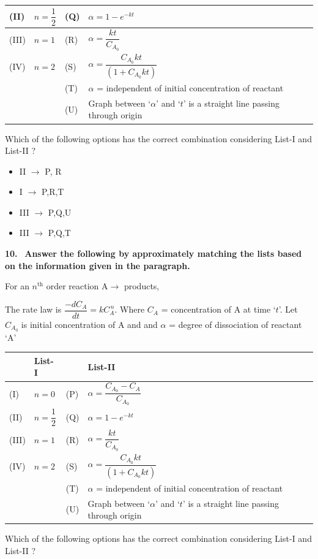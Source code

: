 \documentclass[10pt]{extarticle}
\newcommand{\qn}[1]{\par\smallskip\noindent\textbf{#1.}~}
\newenvironment{qoptions}{\begin{itemize}[leftmargin=1.8em,itemsep=1pt,topsep=2pt,label={}]}{\end{itemize}}
\newcommand{\opt}[2]{\item[(#1)] #2}
\begin{document}
\begin{multicols}{2}
{\begin{center}
\begin{tabular}{|L{0.85cm}|L{1.2cm}|L{0.65cm}|L{3.5cm}|}
\hline
(II) & $n=\dfrac12$ & (Q) & $\alpha=1-e^{-kt}$\\
\hline
(III) & $n=1$ & (R) & $\alpha=\dfrac{kt}{C_{A_0}}$\\
\hline
(IV) & $n=2$ & (S) & $\alpha=\dfrac{C_{A_0}kt}{(1+C_{A_0}kt)}$\\
\hline
 & & (T) & $\alpha$ = independent of initial concentration of reactant\\
\hline
 & & (U) & Graph between `$\alpha$' and `$t$' is a straight line passing through origin\\
\hline
\end{tabular}\end{center}}
Which of the following options has the correct combination considering List-I and List-II ?
\begin{qoptions}
\opt{A}{II $\to$ P, R}
\opt{B}{I $\to$ P,R,T}
\opt{C}{III $\to$ P,Q,U}
\opt{D}{III $\to$ P,Q,T}
\end{qoptions}
\qn{10} \textbf{Answer the following by approximately matching the lists based on the information given in the paragraph.}\par
For an $n^{\mathrm{th}}$ order reaction $\mathrm A\to$ products,\par
The rate law is $\dfrac{-dC_A}{dt}=kC_A^{\,n}$. Where $C_A$ = concentration of A at time `$t$'. Let $C_{A_0}$ is initial concentration of A and and $\alpha$ = degree of dissociation of reactant `A'
{\small\setlength{\tabcolsep}{3pt}\renewcommand{\arraystretch}{1.25}\begin{center}\begin{tabular}{|L{0.85cm}|L{1.2cm}|L{0.65cm}|L{3.5cm}|}
\hline
 & List-I & & List-II\\
\hline
(I) & $n=0$ & (P) & $\alpha=\dfrac{C_{A_0}-C_A}{C_{A_0}}$\\
\hline
(II) & $n=\dfrac12$ & (Q) & $\alpha=1-e^{-kt}$\\
\hline
(III) & $n=1$ & (R) & $\alpha=\dfrac{kt}{C_{A_0}}$\\
\hline
(IV) & $n=2$ & (S) & $\alpha=\dfrac{C_{A_0}kt}{(1+C_{A_0}kt)}$\\
\hline
 & & (T) & $\alpha$ = independent of initial concentration of reactant\\
\hline
 & & (U) & Graph between `$\alpha$' and `$t$' is a straight line passing through origin\\
\hline
\end{tabular}\end{center}}
Which of the following options has the correct combination considering List-I and List-II ?

\end{multicols}
\end{document}
